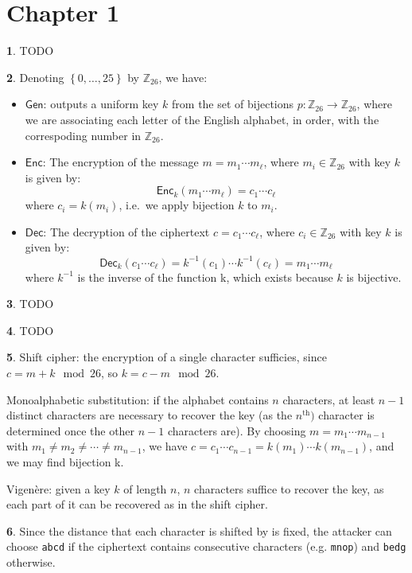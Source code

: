 \documentclass{article}
\theoremstyle{definition}
\newcommand{\bb}[1]{\mathbb{#1}}
\newcommand{\Z}{\bb{Z}}
\newcommand{\set}[1]{\left\{#1\right\}}
\newcommand{\Gen}{\mathsf{Gen}}
\newcommand{\Enc}{\mathsf{Enc}}
\newcommand{\Dec}{\mathsf{Dec}}
\theoremstyle{definition}
\theoremstyle{definition}
\newtheorem{solution-internal}{}[subsection]
\newenvironment{solution}{
  \begin{solution-internal}
}{
  \end{solution-internal}
}
\begin{document}
\section*{Chapter 1}
\setcounter{section}{1}
\setcounter{subsection}{1}

\begin{solution}
  TODO
\end{solution}

\begin{solution}

  Denoting $\set{0, \dots, 25}$ by $\Z_{26}$, we have:
  \begin{itemize}
    \item $\Gen$: outputs a uniform key $k$ from the set of bijections
      $p\colon\Z_{26} \to \Z_{26}$, where we are associating each letter of the
      English alphabet, in order, with the correspoding number in $\Z_{26}$.
    \item $\Enc$: The encryption of the message $m = m_1\cdots m_{\ell}$, where
      $m_i \in \Z_{26}$ with key $k$ is given by:
      \[ \Enc_k(m_1 \cdots m_{\ell}) = c_1 \cdots c_{\ell}\]
      where $c_i = k(m_i)$, i.e.\ we apply bijection $k$ to $m_i$.
    \item $\Dec$: The decryption of the ciphertext $c = c_1 \cdots c_{\ell}$,
      where $c_i \in \Z_{26}$ with key $k$ is given by:
      \[ \Dec_k(c_1 \cdots c_{\ell}) = k^{-1}(c_1) \cdots k^{-1}(c_{\ell}) = m_1 \cdots
      m_{\ell}\]
      where $k^{-1}$ is the inverse of the function k, which exists because $k$
      is bijective.
  \end{itemize}
\end{solution}

\begin{solution}
  TODO
\end{solution}

\begin{solution}
  TODO
\end{solution}

\begin{solution}
  Shift cipher: the encryption of a single character sufficies, since $c = m +
  k \mod 26$, so $k = c - m \mod 26$.
  
  Monoalphabetic substitution: if the alphabet contains $n$ characters, at least
  $n-1$ distinct characters are necessary to recover the key (as the
  $n^{\text{th}})$ character is determined once the other $n-1$ characters are).
  By choosing $m = m_1 \cdots m_{n - 1}$ with $m_1 \neq m_2 \neq \cdots \neq m_{n-1}$, we have $c = c_1 \cdots c_{n-1} = k(m_1) \cdots k(m_{n-1})$, and we may find bijection k.

  Vigenère: given a key $k$ of length $n$, $n$ characters suffice to recover the
  key, as each part of it can be recovered as in the shift cipher.
\end{solution}
\begin{solution}
  Since the distance that each character is shifted by is fixed, the attacker
  can choose {\tt abcd} if the ciphertext contains consecutive characters (e.g.
  {\tt mnop}) and {\tt bedg} otherwise.
\end{solution}
\end{document}

